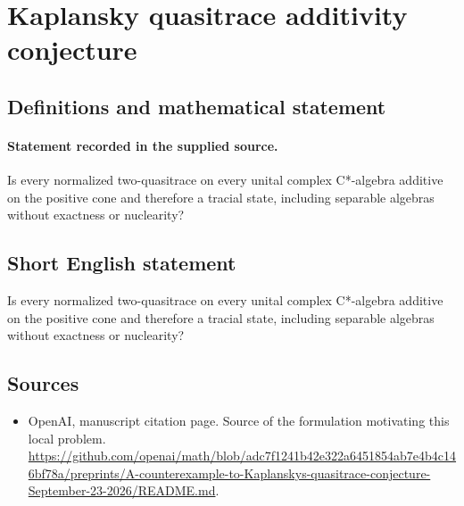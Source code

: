 \documentclass[11pt]{article}
\begin{document}
\section*{Kaplansky quasitrace additivity conjecture}\label{30007304}
\subsection{Definitions and mathematical statement}
\paragraph{Statement recorded in the supplied source.}
Is every normalized two-quasitrace on every unital complex C*-algebra additive on the positive cone and therefore a tracial state, including separable algebras without exactness or nuclearity?
\subsection{Short English statement}
Is every normalized two-quasitrace on every unital complex C*-algebra additive on the positive cone and therefore a tracial state, including separable algebras without exactness or nuclearity?
\subsection{Sources}
\begin{itemize}
\item[S1] OpenAI, manuscript citation page. Source of the formulation motivating this local problem.
\url{https://github.com/openai/math/blob/adc7f1241b42e322a6451854ab7e4b4c146bf78a/preprints/A-counterexample-to-Kaplanskys-quasitrace-conjecture-September-23-2026/README.md}.
\end{itemize}
\end{document}
